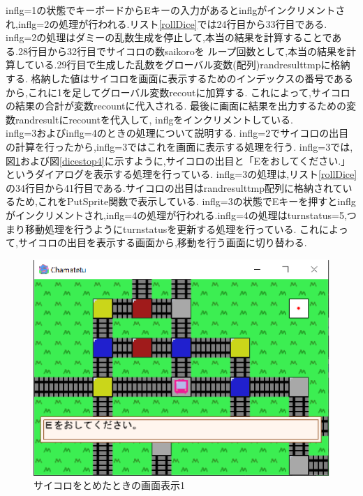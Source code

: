\documentclass[a4j]{jarticle}
\begin{document}
        inflg=1の状態でキーボードからEキーの入力があるとinflgがインクリメントされ,inflg=2の処理が行われる.リスト\ref{rollDice}では24行目から33行目である.
        inflg=2の処理はダミーの乱数生成を停止して,本当の結果を計算することである.28行目から32行目でサイコロの数saikoroを
        ループ回数として,本当の結果を計算している.29行目で生成した乱数をグローバル変数(配列)randresulttmpに格納する. 
        格納した値はサイコロを画面に表示するためのインデックスの番号であるから,これに1を足してグローバル変数recoutに加算する.
        これによって,サイコロの結果の合計が変数recountに代入される. 最後に画面に結果を出力するための変数randresultにrecountを代入して,
        inflgをインクリメントしている. \\
        inflg=3およびinflg=4のときの処理について説明する. inflg=2でサイコロの出目の計算を行ったから,inflg=3ではこれを画面に表示する処理を行う.
        inflg=3では,図\ref{dicestop1}および図\ref{dicestop4}に示すように,サイコロの出目と「Eをおしてください.」というダイアログを表示する処理を行っている.
        inflg=3の処理は,リスト\ref{rollDice}の34行目から41行目である.サイコロの出目はrandresulttmp配列に格納されているため,これをPutSprite関数で表示している.
        inflg=3の状態でEキーを押すとinflgがインクリメントされ,inflg=4の処理が行われる.inflg=4の処理はturnstatus=5,つまり移動処理を行うようにturnstatusを更新する処理を行っている.
        これによって,サイコロの出目を表示する画面から,移動を行う画面に切り替わる.

        \begin{figure}[H]
            \centering
            \includegraphics[scale=1.3]{saikoro1r.eps}
            \caption{サイコロをとめたときの画面表示1}
             \label{dicestop1}
            \end{figure}   
\end{document}
